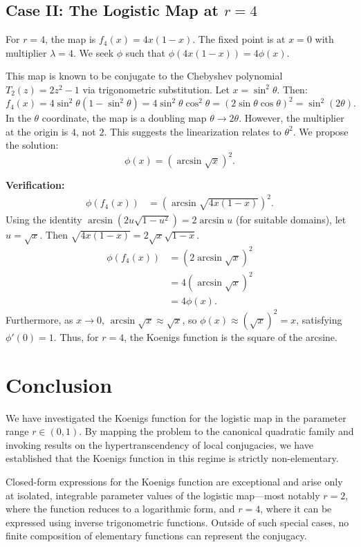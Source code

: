 \documentclass[11pt, a4paper]{article}
\theoremstyle{definition}
\begin{document}
\subsection{Case II: The Logistic Map at $r=4$}
For $r=4$, the map is $f_4(x) = 4x(1-x)$. The fixed point is at $x=0$ with multiplier $\lambda = 4$.
We seek $\phi$ such that $\phi(4x(1-x)) = 4\phi(x)$.

This map is known to be conjugate to the Chebyshev polynomial $T_2(z) = 2z^2-1$ via trigonometric substitution. Let $x = \sin^2 \theta$. Then:
\[
f_4(x) = 4\sin^2\theta(1-\sin^2\theta) = 4\sin^2\theta\cos^2\theta = (2\sin\theta\cos\theta)^2 = \sin^2(2\theta).
\]
In the $\theta$ coordinate, the map is a doubling map $\theta \to 2\theta$. However, the multiplier at the origin is $4$, not $2$. This suggests the linearization relates to $\theta^2$.
We propose the solution:
\begin{equation}
\phi(x) = \left( \arcsin \sqrt{x} \right)^2.
\end{equation}

\textbf{Verification:}
\begin{align*}
\phi(f_4(x)) &= \left( \arcsin \sqrt{4x(1-x)} \right)^2.
\end{align*}
Using the identity $\arcsin(2u\sqrt{1-u^2}) = 2\arcsin u$ (for suitable domains), let $u=\sqrt{x}$. Then $\sqrt{4x(1-x)} = 2\sqrt{x}\sqrt{1-x}$.
\begin{align*}
\phi(f_4(x)) &= \left( 2 \arcsin \sqrt{x} \right)^2 \\
&= 4 \left( \arcsin \sqrt{x} \right)^2 \\
&= 4\phi(x).
\end{align*}
Furthermore, as $x \to 0$, $\arcsin \sqrt{x} \approx \sqrt{x}$, so $\phi(x) \approx (\sqrt{x})^2 = x$, satisfying $\phi'(0)=1$.
Thus, for $r=4$, the Koenigs function is the square of the arcsine.



\section{Conclusion}

We have investigated the Koenigs function for the logistic map in the parameter range $r \in (0,1)$. By mapping the problem to the canonical quadratic family and invoking results on the hypertranscendency of local conjugacies, we have established that the Koenigs function in this regime is strictly non-elementary.

Closed-form expressions for the Koenigs function are exceptional and arise only at isolated, integrable parameter values of the logistic map---most notably $r=2$, where the function reduces to a logarithmic form, and $r=4$, where it can be expressed using inverse trigonometric functions. Outside of such special cases, no finite composition of elementary functions can represent the conjugacy.
\end{document}
